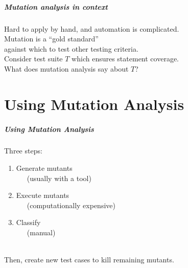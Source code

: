\documentclass{beamer}
\newenvironment{changemargin}[1]{%
  \begin{list}{}{%
    \setlength{\topsep}{0pt}%
    \setlength{\leftmargin}{#1}%
    \setlength{\rightmargin}{1em}
    \setlength{\listparindent}{\parindent}%
    \setlength{\itemindent}{\parindent}%
    \setlength{\parsep}{\parskip}%
  }%
  \item[]}{\end{list}}
\begin{document}
\begin{frame}
  \frametitle{Mutation analysis in context}

  \begin{changemargin}{2em}
    Hard to apply by hand, and automation is complicated.\\[1em]
    Mutation is a ``gold standard'' \\
    \hspace*{2em} against which to test other testing criteria.\\[1em]
    Consider test suite $T$ which ensures statement coverage. \\
    What does mutation analysis say about $T$?
\end{changemargin}
\end{frame}

\usebackgroundtemplate{}

\part{Using Mutation Analysis}
\begin{frame}
  \partpage
\end{frame}


\begin{frame}
  \frametitle{Using Mutation Analysis}

  \Large
  \begin{changemargin}{2em}
    Three steps:
    \begin{enumerate}
    \item Generate mutants\\ ~~~(usually with a tool)
    \item Execute mutants\\ ~~~(computationally expensive)
    \item Classify\\ ~~~(manual)
    \end{enumerate}
    ~\\
    Then, create new test cases to kill remaining mutants.
  \end{changemargin}
  
\end{frame}
\end{document}
